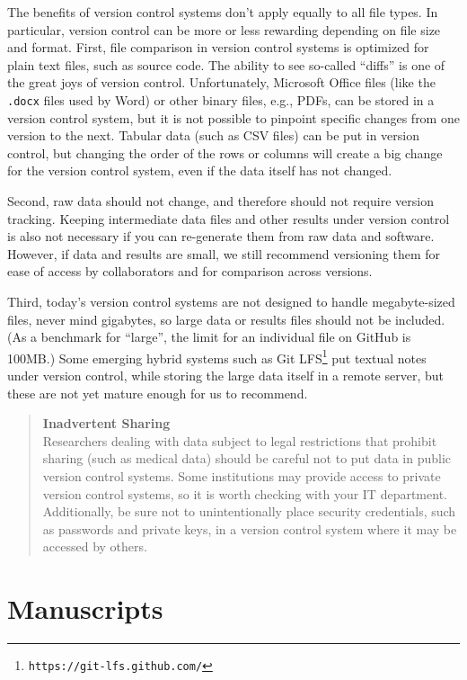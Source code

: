 \documentclass[10pt,letterpaper]{article}
\newcommand{\withurl}[2]{{#1}\footnote{{\texttt{#2}}}}
\newcommand{\practicesection}[2]{\section{#1}\label{#2}}
\begin{document}
The benefits of version control systems don't apply equally to all
file types.  In particular, version control can be more or less
rewarding depending on file size and format.  First, file comparison
in version control systems is optimized for plain text files, such as
source code. The ability to see so-called ``diffs'' is one of the
great joys of version control. Unfortunately, Microsoft\textregistered
Office files (like the \texttt{.docx} files used by Word) or other
binary files, e.g., PDFs, can be stored in a version control system,
but it is not possible to pinpoint specific changes from one version
to the next.  Tabular data (such as CSV files) can be put in version
control, but changing the order of the rows or columns will create a
big change for the version control system, even if the data itself has
not changed.

Second, raw data should not change, and therefore should not require
version tracking.  Keeping intermediate data files and other results
under version control is also not necessary if you can re-generate
them from raw data and software. However, if data and results are
small, we still recommend versioning them for ease of access by
collaborators and for comparison across versions.

Third, today's version control systems are not designed to handle
megabyte-sized files, never mind gigabytes, so large data or results
files should not be included.  (As a benchmark for ``large'', the
limit for an individual file on GitHub is 100MB.)  Some emerging
hybrid systems such as \withurl{Git LFS}{https://git-lfs.github.com/}
put textual notes under version control, while storing the large data
itself in a remote server, but these are not yet mature enough for us
to recommend.

\begin{quote}
  \noindent \textbf{Inadvertent Sharing}
  \\
  Researchers dealing with data subject to legal restrictions that
  prohibit sharing (such as medical data) should be careful not to put
  data in public version control systems. Some institutions may
  provide access to private version control systems, so it is worth
  checking with your IT department.
  \\
  Additionally, be sure not to unintentionally place security
  credentials, such as passwords and private keys, in a version
  control system where it may be accessed by others.
\end{quote}

\practicesection{Manuscripts}{sec:manuscripts}
\end{document}
